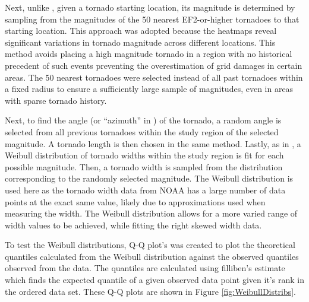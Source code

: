 \documentclass[12pt]{article}
\begin{document}
Next, unlike \cite{strader}, given a tornado starting location, its magnitude is determined by sampling from the magnitudes of the 50 nearest EF2-or-higher tornadoes to that starting location. This approach was adopted because the heatmaps reveal significant variations in tornado magnitude across different locations. This method avoids placing a high magnitude tornado in a region with no historical precedent of such events preventing the overestimation of grid damages in certain areas. The 50 nearest tornadoes were selected instead of all past tornadoes within a fixed radius to ensure a sufficiently large sample of magnitudes, even in areas with sparse tornado history. \par
Next, to find the angle (or “azimuth” in \cite{strader}) of the tornado, a random angle is selected from all previous tornadoes within the study region of the selected magnitude. A tornado length is then chosen in the same method. Lastly, as in \cite{strader}, a Weibull distribution of tornado widths within the study region is fit for each possible magnitude. Then, a tornado width is sampled from the distribution corresponding to the randomly selected magnitude. The Weibull distribution is used here as the tornado width data from NOAA has a large number of data points at the exact same value, likely due to approximations used when measuring the width. The Weibull distribution allows for a more varied range of width values to be achieved, while fitting the right skewed width data. \par
To test the Weibull distributions, Q-Q plot’s was created to plot the theoretical quantiles calculated from the Weibull distribution against the observed quantiles observed from the data. The quantiles are calculated using filliben’s estimate which finds the expected quantile of a given observed data point given it’s rank in the ordered data set. These Q-Q plots are shown in Figure \ref{fig:WeibullDistribs}.  \par
\end{document}
